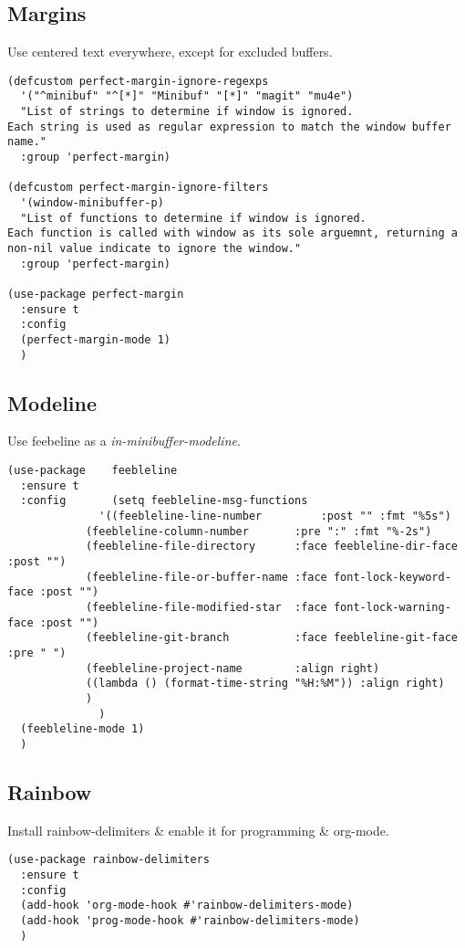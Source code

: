 \documentclass[11pt]{article}
\begin{document}
\subsection{Margins}
\label{sec:org6dedc63}
Use centered text everywhere, except for excluded buffers.
\begin{verbatim}
(defcustom perfect-margin-ignore-regexps
  '("^minibuf" "^[*]" "Minibuf" "[*]" "magit" "mu4e")
  "List of strings to determine if window is ignored.
Each string is used as regular expression to match the window buffer name."
  :group 'perfect-margin)

(defcustom perfect-margin-ignore-filters
  '(window-minibuffer-p)
  "List of functions to determine if window is ignored.
Each function is called with window as its sole arguemnt, returning a non-nil value indicate to ignore the window."
  :group 'perfect-margin)

(use-package perfect-margin
  :ensure t
  :config
  (perfect-margin-mode 1)
  )
\end{verbatim}
\subsection{Modeline}
\label{sec:org63dd955}
Use feebeline as a \emph{in-minibuffer-modeline}.
\begin{verbatim}
(use-package    feebleline
  :ensure t
  :config       (setq feebleline-msg-functions
		      '((feebleline-line-number         :post "" :fmt "%5s")
			(feebleline-column-number       :pre ":" :fmt "%-2s")
			(feebleline-file-directory      :face feebleline-dir-face :post "")
			(feebleline-file-or-buffer-name :face font-lock-keyword-face :post "")
			(feebleline-file-modified-star  :face font-lock-warning-face :post "")
			(feebleline-git-branch          :face feebleline-git-face :pre " ")
			(feebleline-project-name        :align right)
			((lambda () (format-time-string "%H:%M")) :align right)
			)
		      )
  (feebleline-mode 1)
  )
\end{verbatim}
\subsection{Rainbow}
\label{sec:org6b369d5}
Install rainbow-delimiters \& enable it for programming \& org-mode.
\begin{verbatim}
(use-package rainbow-delimiters
  :ensure t
  :config
  (add-hook 'org-mode-hook #'rainbow-delimiters-mode)
  (add-hook 'prog-mode-hook #'rainbow-delimiters-mode)
  )
\end{verbatim}
\end{document}
